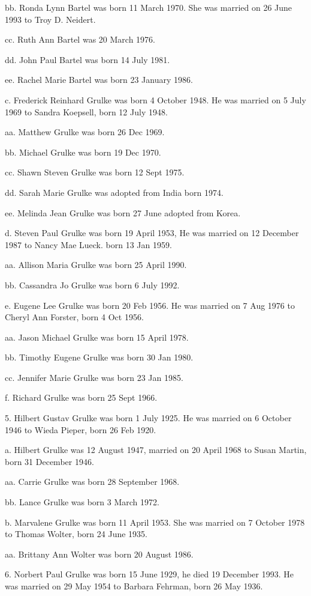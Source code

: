\documentclass[a4paper]{article}
\begin{document}
bb. Ronda Lynn Bartel was born 11 March 1970.  She was married on 26 June 1993 to Troy D. Neidert.

cc. Ruth Ann Bartel was  20 March 1976.

dd. John Paul Bartel was born 14 July 1981.

ee. Rachel Marie Bartel was born 23 January 1986.

c. Frederick Reinhard Grulke was born 4 October 1948.  He was married on 5 July 1969 to Sandra Koepsell, born 12 July 1948.

aa. Matthew Grulke was born 26 Dec 1969.

bb. Michael Grulke was born 19 Dec 1970.

cc. Shawn Steven Grulke was born 12 Sept 1975.

dd. Sarah Marie Grulke was adopted from India born 1974.

ee. Melinda Jean Grulke was born 27 June adopted from Korea.

d. Steven Paul Grulke was born 19 April 1953, He was married on 12 December 1987 to Nancy Mae Lueck. born 13 Jan 1959. 

aa. Allison Maria Grulke was born 25 April 1990.

bb. Cassandra Jo Grulke was born 6 July 1992.

e. Eugene Lee Grulke was born 20 Feb 1956.  He was married on 7 Aug 1976 to Cheryl Ann Forster, born 4 Oct 1956.

aa. Jason Michael Grulke was born 15 April 1978.

bb. Timothy Eugene Grulke was born 30 Jan 1980.

cc. Jennifer Marie Grulke was born 23 Jan 1985.

f. Richard Grulke was born 25 Sept 1966.

5. Hilbert Gustav Grulke was born 1 July 1925.  He was married on 6 October 1946 to Wieda Pieper, born 26 Feb 1920.  

a. Hilbert Grulke was 12 August 1947, married on 20 April 1968 to Susan Martin, born 31 December 1946.

aa. Carrie Grulke was born 28 September 1968.

bb. Lance Grulke was born 3 March 1972.

b. Marvalene Grulke was born 11 April 1953.  She was married on 7 October 1978 to Thomas Wolter, born 24 June 1935.  

aa. Brittany Ann Wolter was born 20 August 1986.

6. Norbert Paul Grulke was born 15 June 1929, he died 19 December 1993. He was married on 29 May 1954 to Barbara Fehrman, born 26 May 1936.
\end{document}
